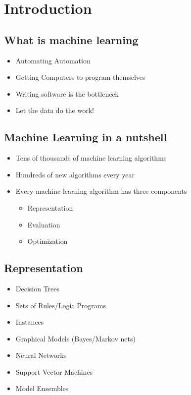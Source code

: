 
\section{Introduction}
\subsection{What is machine learning}
\begin{itemize}
  \item Automating Automation
  \item Getting Computers to program themselves
  \item Writing software is the bottleneck
  \item Let the data do the work!
\end{itemize}

\subsection{Machine Learning in a nutshell}
\begin{itemize}
  \item Tens of thousands of machine learning algorithms
  \item Hundreds of new algorithms every year
  \item Every machine learning algorithm has three components
  \begin{itemize}
    \item Representation
    \item Evaluation
    \item Optimization
  \end{itemize}
\end{itemize}

\subsection{Representation}
\begin{itemize}
  \item Decision Trees
  \item Sets of Rules/Logic Programs
  \item Instances
  \item Graphical Models (Bayes/Markov nets)
  \item Neural Networks
  \item Support Vector Machines
  \item Model Ensembles
\end{itemize}

